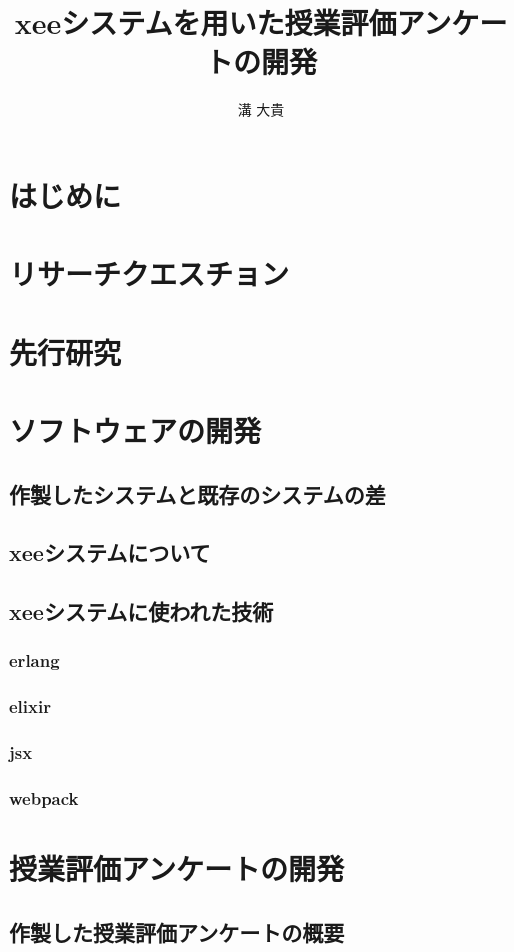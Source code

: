 \documentclass[11pt,a4paper]{jsarticle}
\title{xeeシステムを用いた授業評価アンケートの開発}
\author{溝 大貴}
\begin{document}
\maketitle
%
%
\section{はじめに}
\section{リサーチクエスチョン}
\section{先行研究}
\section{ソフトウェアの開発}
\subsection{作製したシステムと既存のシステムの差}
\subsection{xeeシステムについて}
\subsection{xeeシステムに使われた技術}
\subsubsection{erlang}
\subsubsection{elixir}
\subsubsection{jsx}
\subsubsection{webpack}
\section{授業評価アンケートの開発}
\subsection{作製した授業評価アンケートの概要}
\end{document}
